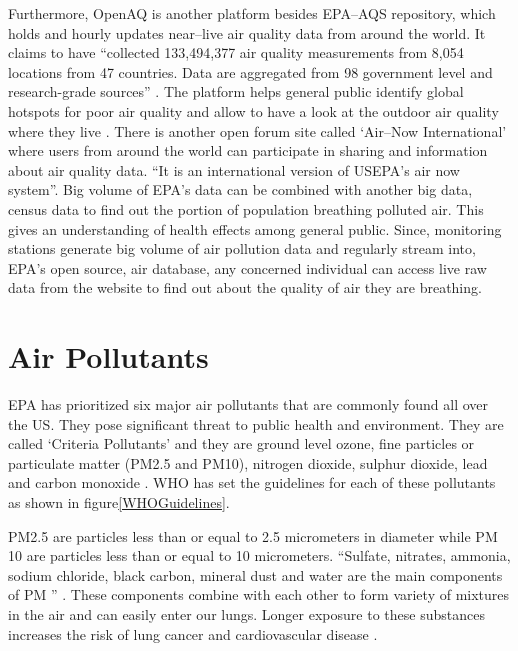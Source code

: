 \documentclass[sigconf]{acmart}
\begin{document}
Furthermore, OpenAQ is another platform besides EPA--AQS repository, which holds and hourly updates near--live air quality data from around the world. It claims to have ``collected 133,494,377 air quality measurements from 8,054 locations from 47 countries. Data are aggregated from 98 government level and research-grade sources'' \cite{googlecloud}. The platform helps general public identify global hotspots for poor air quality and allow to have a look at the outdoor air quality where they live \cite{googlecloud}. There is another open forum site called `Air--Now International' where users from around the world can participate in sharing and information about air quality data. ``It is an international version of USEPA's air now system''\cite{air-quality}. 
 Big volume of EPA's data can be combined with another big data, census data to find out the portion of population breathing polluted air. This gives an understanding of health effects among general public. Since, monitoring stations generate big volume of air pollution data and regularly stream into, EPA's open source, air database, any concerned individual can access live raw data from the website to find out about the quality of air they are breathing.  


\section{Air Pollutants}
EPA has prioritized six major air pollutants that are commonly found all over the US. They pose significant threat to public health and environment.  They are called `Criteria Pollutants' and they are ground level ozone, fine particles or particulate matter (PM2.5 and PM10), nitrogen dioxide, sulphur dioxide, lead and carbon monoxide \cite{epa-gov}. WHO has set the guidelines for each of these pollutants as shown in figure\ref{WHOGuidelines}.

PM2.5 are particles less than or equal to 2.5 micrometers in diameter while PM 10 are particles less than or equal to 10 micrometers. ``Sulfate, nitrates, ammonia, sodium chloride, black carbon, mineral dust and water are the main components of PM '' \cite{www-who}. These components combine with each other to form variety of mixtures in the air and can easily enter our lungs. Longer exposure to these substances increases the risk of lung cancer and cardiovascular disease \cite{www-who}. 
\end{document}
